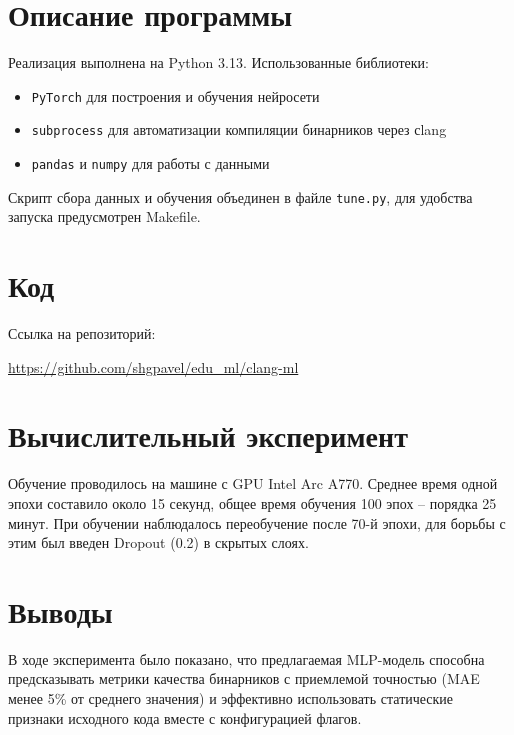 \documentclass[a4paper,12pt]{article}
\begin{document}
\section{Описание программы}
Реализация выполнена на Python 3.13.
Использованные библиотеки:
\begin{itemize}
  \item \texttt{PyTorch} для построения и обучения нейросети
  \item \texttt{subprocess} для автоматизации компиляции
    бинарников через сlang
  \item \texttt{pandas} и \texttt{numpy} для работы с данными
\end{itemize}
Скрипт сбора данных и обучения объединен в файле \texttt{tune.py}, для удобства
запуска предусмотрен Makefile.

\section{Код}
Ссылка на репозиторий:

\url{https://github.com/shgpavel/edu_ml/clang-ml}

\section{Вычислительный эксперимент}
Обучение проводилось на машине с GPU Intel Arc A770. Среднее время одной эпохи составило
около 15 секунд, общее время обучения 100 эпох -- порядка 25 минут.
При обучении наблюдалось переобучение после 70-й эпохи, для борьбы с этим был
введен Dropout (0.2) в скрытых слоях.


\section{Выводы}
В ходе эксперимента было показано, что предлагаемая MLP-модель способна предсказывать
метрики качества бинарников с приемлемой точностью (MAE менее 5\% от среднего значения)
и эффективно использовать статические признаки исходного кода вместе с конфигурацией флагов.
\end{document}
